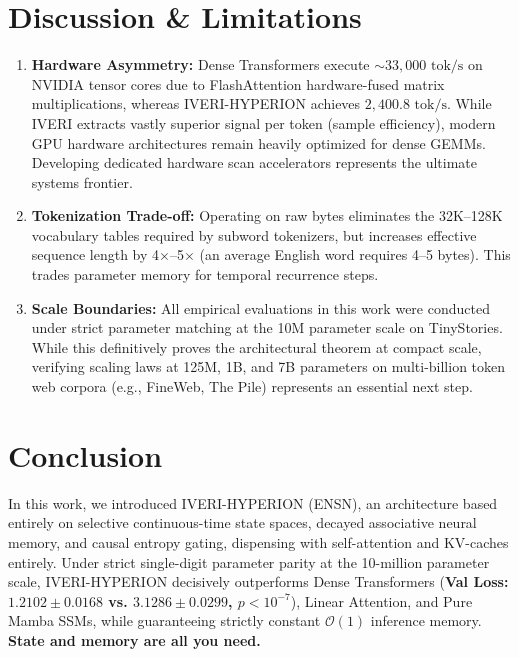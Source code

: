 \documentclass[10pt,twocolumn,letterpaper]{article}
\begin{document}
\section{Discussion \& Limitations}
\label{sec:discussion}

\begin{enumerate}[leftmargin=*]
    \item \textbf{Hardware Asymmetry:} Dense Transformers execute $\sim 33,000\text{ tok/s}$ on NVIDIA tensor cores due to FlashAttention hardware-fused matrix multiplications, whereas IVERI-HYPERION achieves $2,400.8\text{ tok/s}$. While IVERI extracts vastly superior signal per token (sample efficiency), modern GPU hardware architectures remain heavily optimized for dense GEMMs. Developing dedicated hardware scan accelerators represents the ultimate systems frontier.
    \item \textbf{Tokenization Trade-off:} Operating on raw bytes eliminates the 32K–128K vocabulary tables required by subword tokenizers, but increases effective sequence length by 4$\times$–5$\times$ (an average English word requires 4–5 bytes). This trades parameter memory for temporal recurrence steps.
    \item \textbf{Scale Boundaries:} All empirical evaluations in this work were conducted under strict parameter matching at the 10M parameter scale on TinyStories. While this definitively proves the architectural theorem at compact scale, verifying scaling laws at 125M, 1B, and 7B parameters on multi-billion token web corpora (e.g., FineWeb, The Pile) represents an essential next step.
\end{enumerate}

\section{Conclusion}
\label{sec:conclusion}

In this work, we introduced IVERI-HYPERION (ENSN), an architecture based entirely on selective continuous-time state spaces, decayed associative neural memory, and causal entropy gating, dispensing with self-attention and KV-caches entirely. Under strict single-digit parameter parity at the 10-million parameter scale, IVERI-HYPERION decisively outperforms Dense Transformers (\textbf{Val Loss: $1.2102 \pm 0.0168$ vs. $3.1286 \pm 0.0299$, $p < 10^{-7}$}), Linear Attention, and Pure Mamba SSMs, while guaranteeing strictly constant $\mathcal{O}(1)$ inference memory. \textbf{State and memory are all you need.}
\end{document}

